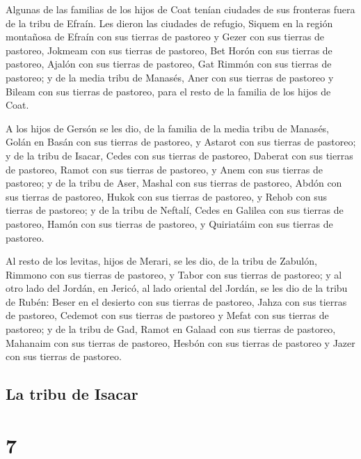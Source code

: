  Algunas de las familias de los hijos de Coat tenían
ciudades de sus fronteras fuera de la tribu de Efraín. 
Les dieron las ciudades de refugio, Siquem en la región montañosa de
Efraín con sus tierras de pastoreo y Gezer con sus tierras de pastoreo,
 Jokmeam con sus tierras de pastoreo, Bet Horón con sus
tierras de pastoreo,  Ajalón con sus tierras de pastoreo,
Gat Rimmón con sus tierras de pastoreo;  y de la media
tribu de Manasés, Aner con sus tierras de pastoreo y Bileam con sus
tierras de pastoreo, para el resto de la familia de los hijos de Coat.

 A los hijos de Gersón se les dio, de la familia de la
media tribu de Manasés, Golán en Basán con sus tierras de pastoreo, y
Astarot con sus tierras de pastoreo;  y de la tribu de
Isacar, Cedes con sus tierras de pastoreo, Daberat con sus tierras de
pastoreo,  Ramot con sus tierras de pastoreo, y Anem con
sus tierras de pastoreo;  y de la tribu de Aser, Mashal
con sus tierras de pastoreo, Abdón con sus tierras de pastoreo,
 Hukok con sus tierras de pastoreo, y Rehob con sus
tierras de pastoreo;  y de la tribu de Neftalí, Cedes en
Galilea con sus tierras de pastoreo, Hamón con sus tierras de pastoreo,
y Quiriatáim con sus tierras de pastoreo.

 Al resto de los levitas, hijos de Merari, se les dio, de
la tribu de Zabulón, Rimmono con sus tierras de pastoreo, y Tabor con
sus tierras de pastoreo;  y al otro lado del Jordán, en
Jericó, al lado oriental del Jordán, se les dio de la tribu de Rubén:
Beser en el desierto con sus tierras de pastoreo, Jahza con sus tierras
de pastoreo,  Cedemot con sus tierras de pastoreo y Mefat
con sus tierras de pastoreo;  y de la tribu de Gad, Ramot
en Galaad con sus tierras de pastoreo, Mahanaim con sus tierras de
pastoreo,  Hesbón con sus tierras de pastoreo y Jazer con
sus tierras de pastoreo.

\hypertarget{la-tribu-de-isacar}{%
\subsection{La tribu de Isacar}\label{la-tribu-de-isacar}}

\hypertarget{section-6}{%
\section{7}\label{section-6}}

